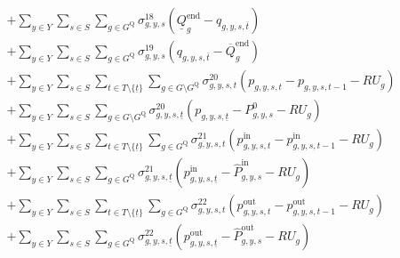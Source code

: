 \documentclass{article}
\newcommand{\sGenerators}{G}
\newcommand{\sStorage}{G^{\mathrm{Q}}}
\newcommand{\sYears}{Y}
\newcommand{\sScenarios}{S}
\newcommand{\sIntervals}{T}
\newcommand{\iGenerator}{g}
\newcommand{\iYear}{y}
\newcommand{\iScenario}{s}
\newcommand{\iInterval}{t}
\newcommand{\iIntervalTerminal}{\overline{\iInterval}}
\newcommand{\iIntervalStart}{\underline{\iInterval}}
\newcommand{\cRampRateUp}[1][\iGenerator]{RU_{#1}}
\newcommand{\cStorageUnitEnergyIntervalEndMax}[1][\iGenerator]{\overline{Q}^{\mathrm{end}}_{#1}}
\newcommand{\cStorageUnitEnergyIntervalEndMin}[1][\iGenerator]{\underline{Q}^{\mathrm{end}}_{#1}}
\newcommand{\cPowerInitial}[1][\iGenerator,\iYear,\iScenario]{P_{#1}^{0}}
\newcommand{\cPowerOutInitial}[1][\iGenerator,\iYear,\iScenario]{\hat{P}_{#1}^{\mathrm{out}}}
\newcommand{\cPowerInInitial}[1][\iGenerator,\iYear,\iScenario]{\hat{P}_{#1}^{\mathrm{in}}}
\newcommand{\vPower}[1][\iGenerator,\iYear,\iScenario,\iInterval]{p_{#1}}
\newcommand{\vPowerIn}[1][\iGenerator,\iYear,\iScenario,\iInterval]{p^{\mathrm{in}}_{#1}}
\newcommand{\vPowerOut}[1][\iGenerator,\iYear,\iScenario,\iInterval]{p^{\mathrm{out}}_{#1}}
\newcommand{\vStorageUnitEnergy}[1][\iGenerator,\iYear,\iScenario,\iInterval]{q_{#1}}
\newcommand{\dMinStorageEnergyIntervalEnd}[1][\iGenerator,\iYear,\iScenario]{\sigma_{#1}^{18}}
\newcommand{\dMaxStorageEnergyIntervalEnd}[1][\iGenerator,\iYear,\iScenario]{\sigma_{#1}^{19}}
\newcommand{\dRampRateUp}[1][\iGenerator,\iYear,\iScenario,\iInterval]{\sigma_{#1}^{20}}
\newcommand{\dRampRateUpStorageCharging}[1][\iGenerator,\iYear,\iScenario,\iInterval]{\sigma_{#1}^{21}}
\newcommand{\dRampRateUpStorageDischarging}[1][\iGenerator,\iYear,\iScenario,\iInterval]{\sigma_{#1}^{22}}
\begin{document}
\begin{align}
		& + \sum\limits_{\iYear \in \sYears}\sum\limits_{\iScenario \in \sScenarios} \sum\limits_{\iGenerator \in \sStorage} \dMinStorageEnergyIntervalEnd \left(\cStorageUnitEnergyIntervalEndMin - \vStorageUnitEnergy[\iGenerator,\iYear,\iScenario,\iIntervalTerminal]\right)\\
		& + \sum\limits_{\iYear \in \sYears}\sum\limits_{\iScenario \in \sScenarios} \sum\limits_{\iGenerator \in \sStorage} \dMaxStorageEnergyIntervalEnd \left(\vStorageUnitEnergy[\iGenerator,\iYear,\iScenario,\iIntervalTerminal] - \cStorageUnitEnergyIntervalEndMax\right)\\
		& + \sum\limits_{\iYear \in \sYears}\sum\limits_{\iScenario \in \sScenarios}\sum\limits_{\iInterval \in \sIntervals \setminus \{\iIntervalStart\}} \sum\limits_{\iGenerator \in \sGenerators \setminus \sStorage} \dRampRateUp \left(\vPower - \vPower[\iGenerator,\iYear,\iScenario,\iInterval-1] - \cRampRateUp\right)\\
		& + \sum\limits_{\iYear \in \sYears}\sum\limits_{\iScenario \in \sScenarios} \sum\limits_{\iGenerator \in \sGenerators \setminus \sStorage} \dRampRateUp[\iGenerator,\iYear,\iScenario,\iIntervalStart] \left(\vPower[\iGenerator,\iYear,\iScenario,\iIntervalStart] - \cPowerInitial - \cRampRateUp\right)\\
		& +  \sum\limits_{\iYear \in \sYears}\sum\limits_{\iScenario \in \sScenarios} \sum\limits_{\iInterval \in \sIntervals \setminus \{\iIntervalStart\}} \sum\limits_{\iGenerator \in \sStorage} \dRampRateUpStorageCharging \left(\vPowerIn - \vPowerIn[\iGenerator,\iYear,\iScenario,\iInterval-1] - \cRampRateUp\right) \\
		& +  \sum\limits_{\iYear \in \sYears}\sum\limits_{\iScenario \in \sScenarios} \sum\limits_{\iGenerator \in \sStorage} \dRampRateUpStorageCharging[\iGenerator,\iYear,\iScenario,\iIntervalStart] \left(\vPowerIn[\iGenerator,\iYear,\iScenario,\iIntervalStart] - \cPowerInInitial - \cRampRateUp\right) \\
		& +  \sum\limits_{\iYear \in \sYears}\sum\limits_{\iScenario \in \sScenarios} \sum\limits_{\iInterval \in \sIntervals \setminus \{\iIntervalStart\}} \sum\limits_{\iGenerator \in \sStorage} \dRampRateUpStorageDischarging \left(\vPowerOut - \vPowerOut[\iGenerator,\iYear,\iScenario,\iInterval-1] - \cRampRateUp\right) \\
		& +  \sum\limits_{\iYear \in \sYears}\sum\limits_{\iScenario \in \sScenarios} \sum\limits_{\iGenerator \in \sStorage} \dRampRateUpStorageDischarging[\iGenerator,\iYear,\iScenario,\iIntervalStart] \left(\vPowerOut[\iGenerator,\iYear,\iScenario,\iIntervalStart] - \cPowerOutInitial - \cRampRateUp\right) \\

\end{align}
\end{document}
